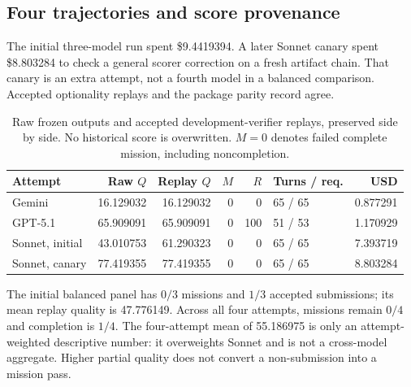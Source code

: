 \documentclass[11pt,a4paper]{article}
\begin{document}
\subsection{Four trajectories and score provenance}

The initial three-model run spent \$9.4419394. A later Sonnet canary spent \$8.803284 to check a general scorer correction on a fresh artifact chain. That canary is an extra attempt, not a fourth model in a balanced comparison. Accepted optionality replays and the package parity record agree.\cite{c2run,c2diag,c2canary,c2optional,c2package}

\begin{table}[H]\small
\begin{tabularx}{\textwidth}{@{}Yrrrrlr@{}}\toprule
Attempt & Raw $Q$ & Replay $Q$ & $M$ & $R$ & Turns / req. & USD \\\midrule
Gemini & 16.129032 & 16.129032 & 0 & 0 & 65 / 65 & 0.877291 \\
GPT-5.1 & 65.909091 & 65.909091 & 0 & 100 & 51 / 53 & 1.170929 \\
Sonnet, initial & 43.010753 & 61.290323 & 0 & 0 & 65 / 65 & 7.393719 \\
Sonnet, canary & 77.419355 & 77.419355 & 0 & 0 & 65 / 65 & 8.803284 \\\bottomrule
\end{tabularx}
\caption{Raw frozen outputs and accepted development-verifier replays, preserved side by side. No historical score is overwritten. $M=0$ denotes failed complete mission, including noncompletion.}
\end{table}

The initial balanced panel has $0/3$ missions and $1/3$ accepted submissions; its mean replay quality is 47.776149. Across all four attempts, missions remain $0/4$ and completion is $1/4$. The four-attempt mean of 55.186975 is only an attempt-weighted descriptive number: it overweights Sonnet and is not a cross-model aggregate. Higher partial quality does not convert a non-submission into a mission pass.
\end{document}
